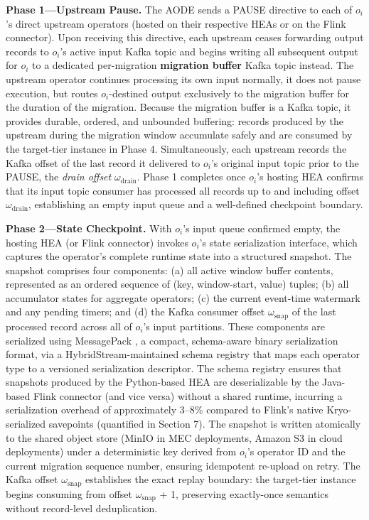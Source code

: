 \documentclass[preprint,review,12pt]{elsarticle}
\begin{document}
\textbf{Phase 1—Upstream Pause.} The AODE sends a PAUSE directive to each of $o_i$'s direct upstream operators (hosted on their respective HEAs or on the Flink connector). Upon receiving this directive, each upstream ceases forwarding output records to $o_i$'s active input Kafka topic and begins writing all subsequent output for $o_i$ to a dedicated per-migration \textbf{migration buffer} Kafka topic instead. The upstream operator continues processing its own input normally, it does not pause execution, but routes $o_i$-destined output exclusively to the migration buffer for the duration of the migration. Because the migration buffer is a Kafka topic, it provides durable, ordered, and unbounded buffering: records produced by the upstream during the migration window accumulate safely and are consumed by the target-tier instance in Phase 4. Simultaneously, each upstream records the Kafka offset of the last record it delivered to $o_i$'s original input topic prior to the PAUSE, the \emph{drain offset} $\omega_{\text{drain}}$. Phase 1 completes once $o_i$'s hosting HEA confirms that its input topic consumer has processed all records up to and including offset $\omega_{\text{drain}}$, establishing an empty input queue and a well-defined checkpoint boundary.

\textbf{Phase 2—State Checkpoint.} With $o_i$'s input queue confirmed empty, the hosting HEA (or Flink connector) invokes $o_i$'s state serialization interface, which captures the operator's complete runtime state into a structured snapshot. The snapshot comprises four components: (a) all active window buffer contents, represented as an ordered sequence of (key, window-start, value) tuples; (b) all accumulator states for aggregate operators; (c) the current event-time watermark and any pending timers; and (d) the Kafka consumer offset $\omega_{\text{snap}}$ of the last processed record across all of $o_i$'s input partitions. These components are serialized using MessagePack \cite{msgpack2023}, a compact, schema-aware binary serialization format, via a HybridStream-maintained schema registry that maps each operator type to a versioned serialization descriptor. The schema registry ensures that snapshots produced by the Python-based HEA are deserializable by the Java-based Flink connector (and vice versa) without a shared runtime, incurring a serialization overhead of approximately 3--8\% compared to Flink's native Kryo-serialized savepoints (quantified in Section 7). The snapshot is written atomically to the shared object store (MinIO in MEC deployments, Amazon S3 in cloud deployments) under a deterministic key derived from $o_i$'s operator ID and the current migration sequence number, ensuring idempotent re-upload on retry. The Kafka offset $\omega_{\text{snap}}$ establishes the exact replay boundary: the target-tier instance begins consuming from offset $\omega_{\text{snap}}$ + 1, preserving exactly-once semantics without record-level deduplication.
\end{document}
